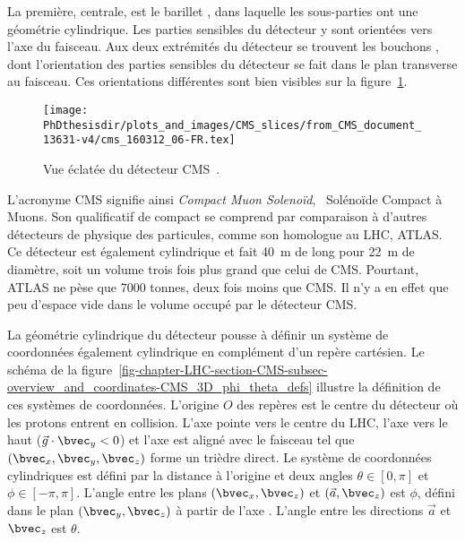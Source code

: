 La première, centrale, est le \og barillet \fg, dans laquelle les sous-parties ont une géométrie cylindrique.
Les parties sensibles du détecteur y sont orientées vers l'axe du faisceau.
Aux deux extrémités du détecteur se trouvent les \og bouchons \fg, dont l'orientation des parties sensibles du détecteur se fait dans le plan transverse au faisceau.
Ces orientations différentes sont bien visibles sur la figure~\ref{fig-chapter-LHC-section-CMS-subsec-overview_and_coordinates-vue_eclatee_CMS}.
\begin{figure}[h]
\centering
\texttt{[image: \\PhDthesisdir/plots\_and\_images/CMS\_slices/from\_CMS\_document\_13631-v4/cms\_160312\_06-FR.tex]}
\caption[Vue éclatée du détecteur CMS.]{Vue éclatée du détecteur CMS~\cite{CMS_document_13631-v4}.}
\label{fig-chapter-LHC-section-CMS-subsec-overview_and_coordinates-vue_eclatee_CMS}
\end{figure}
\par L'acronyme CMS signifie ainsi \emph{Compact Muon Solenoïd}, \ie\ Solénoïde Compact à Muons.
Son qualificatif de \og compact \fg{} se comprend par comparaison à d'autres détecteurs de physique des particules, comme son homologue au LHC, ATLAS.
Ce détecteur est également cylindrique et fait \SI{40}{\meter} de long pour \SI{22}{\meter} de diamètre, soit un volume trois fois plus grand que celui de CMS.
Pourtant, ATLAS ne pèse \og que \fg{} \num{7000} tonnes, deux fois moins que CMS.
Il n'y a en effet que peu d'espace vide dans le volume occupé par le détecteur CMS.
\par La géométrie cylindrique du détecteur pousse à définir un système de coordonnées également cylindrique en complément d'un repère cartésien.
Le schéma de la figure~\ref{fig-chapter-LHC-section-CMS-subsec-overview_and_coordinates-CMS_3D_phi_theta_defs} illustre la définition de ces systèmes de coordonnées.
L'origine $O$ des repères est le centre du détecteur où les protons entrent en collision.
L'axe  pointe vers le centre du LHC, l'axe  vers le haut ($\vec{g}\cdot\bvec_y<0$) et l'axe  est aligné avec le faisceau tel que $(\bvec_x, \bvec_y, \bvec_z)$ forme un trièdre direct.
Le système de coordonnées cylindriques est défini par la distance à l'origine et deux angles $\theta\in[0,\pi]$ et $\phi\in[-\pi,\pi]$.
L'angle entre les plans $(\bvec_x, \bvec_z)$ et $(\vec{a}, \bvec_z)$ est $\phi$, défini dans le plan $(\bvec_y,\bvec_z)$ à partir de l'axe .
L'angle entre les directions $\vec{a}$ et $\bvec_z$ est $\theta$.
